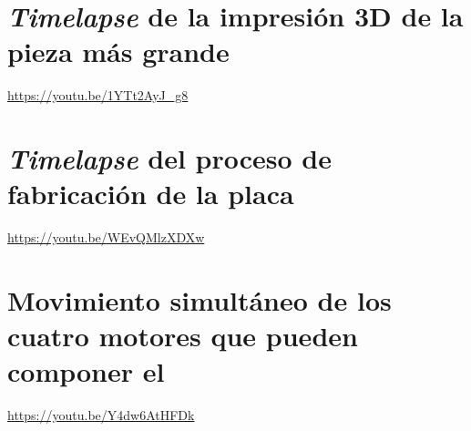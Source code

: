 \section*{\textit{Timelapse} de la impresión 3D de la pieza más grande}
\begin{center}
    \url{https://youtu.be/1YTt2AyJ_g8} \qquad {}
\end{center}

\section*{\textit{Timelapse} del proceso de fabricación de la placa}
\begin{center}
    \url{https://youtu.be/WEvQMlzXDXw} \qquad {}
\end{center}

\section*{Movimiento simultáneo de los cuatro motores que pueden componer el \pArm{}}
\begin{center}
    \url{https://youtu.be/Y4dw6AtHFDk} \qquad {}
\end{center}
